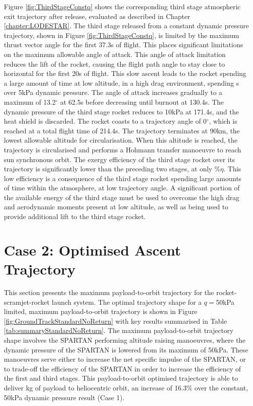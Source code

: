 Figure \ref{fig:ThirdStageConstq} shows the corresponding third stage atmospheric exit trajectory after release, evaluated as described in Chapter \ref{chapter:LODESTAR}. The third stage released from a constant dynamic pressure trajectory, shown in Figure \ref{fig:ThirdStageConstq}, is limited by the maximum thrust vector angle for the first 37.3s of flight. This places significant limitations on the maximum allowable angle of attack. This angle of attack limitation reduces the lift of the rocket, causing the flight path angle to stay close to horizontal for the first 20s of flight. This slow ascent leads to the rocket spending a large amount of time at low altitude, in a high drag environment, spending \thirdqOverFiveConstq s over 5kPa dynamic pressure. The angle of attack increases gradually to a maximum of 13.2$^\circ$ at 62.5s before decreasing until burnout at 130.4s. The dynamic pressure of the third stage rocket reduces to 10kPa at 171.4s, and the heat shield is discarded. The rocket coasts to a trajectory angle of 0$^\circ$, which is reached at a total flight time of 214.4s. The trajectory terminates at 90km, the lowest allowable altitude for circularisation. 
When this altitude is reached, the trajectory is circularised and performs a Hohmann transfer manoeuvre to reach sun synchronous orbit.
The exergy efficiency of the third stage rocket over its trajectory is significantly lower than the preceding two stages, at only \thirddExergyEffConstq \%$\eta$. This low efficiency is a consequence of the third stage rocket spending large amounts of time within the atmosphere, at low trajectory angle. A significant portion of the available energy of the third stage must be used to overcome the high drag and aerodynamic moments present at low altitude, as well as being used to provide additional lift to the third stage rocket.  







\section{Case 2: Optimised Ascent Trajectory}\label{sec:optimisednoreturn}


This section presents the maximum payload-to-orbit trajectory for the rocket-scramjet-rocket launch system. 
The optimal trajectory shape for a $q=$50kPa limited, maximum payload-to-orbit trajectory is shown in Figure \ref{fig:GroundTrackStandardNoReturn} with key results summarised in Table \ref{tab:summaryStandardNoReturn}. The maximum payload-to-orbit trajectory shape involves the SPARTAN performing altitude raising manoeuvres, where the dynamic pressure of the SPARTAN is lowered from its maximum of 50kPa. These manoeuvres serve either to increase the net specific impulse of the SPARTAN, or to trade-off the efficiency of the SPARTAN in order to increase the efficiency of the first and third stages. 
This payload-to-orbit optimised trajectory is able to deliver \PayloadToOrbitStandardNoReturn kg of payload to heliocentric orbit, an increase of 16.3\% over the constant, 50kPa dynamic pressure result (Case 1).

